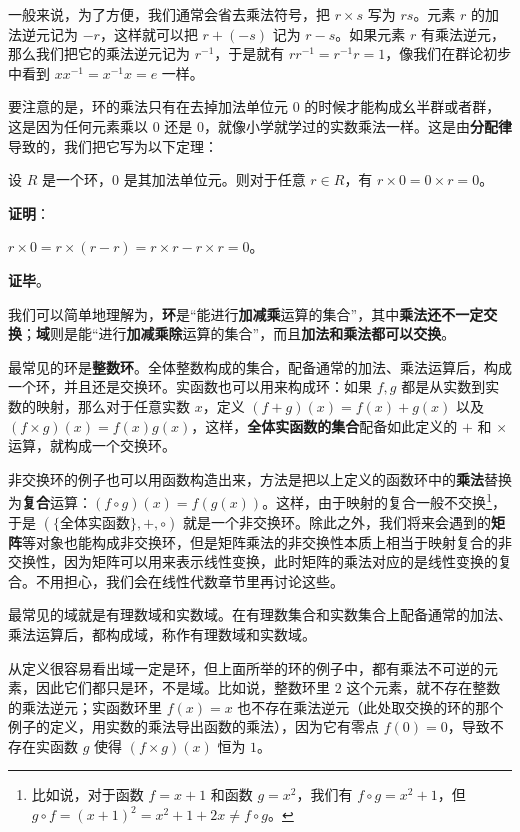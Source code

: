 一般来说，为了方便，我们通常会省去乘法符号，把 $r\times s$ 写为 $rs$。元素 $r$ 的加法逆元记为 $-r$，这样就可以把 $r+(-s)$ 记为 $r-s$。如果元素 $r$ 有乘法逆元，那么我们把它的乘法逆元记为 $r^{-1}$，于是就有 $rr^{-1}=r^{-1}r=1$，像我们在群论初步中看到 $xx^{-1}=x^{-1}x=e$ 一样。

要注意的是，环的乘法只有在去掉加法单位元 $0$ 的时候才能构成幺半群或者群，这是因为任何元素乘以 $0$ 还是 $0$，就像小学就学过的实数乘法一样。这是由\textbf{分配律}导致的，我们把它写为以下定理：

\begin{theorem}{}
设 $R$ 是一个环，$0$ 是其加法单位元。则对于任意 $r\in R$，有 $r\times 0=0\times r=0$。
\end{theorem}
\textbf{证明}：

$r\times 0=r\times (r-r)=r\times r-r\times r=0$。

\textbf{证毕}。



我们可以简单地理解为，\textbf{环}是“能进行\textbf{加减乘}运算的集合”，其中\textbf{乘法还不一定交换}；\textbf{域}则是能“进行\textbf{加减乘除}运算的集合”，而且\textbf{加法和乘法都可以交换}。

最常见的环是\textbf{整数环}。全体整数构成的集合，配备通常的加法、乘法运算后，构成一个环，并且还是交换环。实函数也可以用来构成环：如果 $f, g$ 都是从实数到实数的映射，那么对于任意实数 $x$，定义 $(f+g)(x)=f(x)+g(x)$ 以及 $(f\times g)(x)=f(x)g(x)$，这样，\textbf{全体实函数的集合}配备如此定义的 $+$ 和 $\times$ 运算，就构成一个交换环。

非交换环的例子也可以用函数构造出来，方法是把以上定义的函数环中的\textbf{乘法}替换为\textbf{复合}运算：$(f\circ g)(x)=f(g(x))$。这样，由于映射的复合一般不交换\footnote{比如说，对于函数 $f=x+1$ 和函数 $g=x^2$，我们有 $f\circ g=x^2+1$，但 $g\circ f=(x+1)^2=x^2+1+2x\not=f\circ g$。}，于是 $(\{\text{全体实函数}\}, +, \circ)$ 就是一个非交换环。除此之外，我们将来会遇到的\textbf{矩阵}等对象也能构成非交换环，但是矩阵乘法的非交换性本质上相当于映射复合的非交换性，因为矩阵可以用来表示线性变换，此时矩阵的乘法对应的是线性变换的复合。不用担心，我们会在线性代数章节里再讨论这些。

最常见的域就是有理数域和实数域。在有理数集合和实数集合上配备通常的加法、乘法运算后，都构成域，称作有理数域和实数域。

从定义很容易看出域一定是环，但上面所举的环的例子中，都有乘法不可逆的元素，因此它们都只是环，不是域。比如说，整数环里 $2$ 这个元素，就不存在整数的乘法逆元；实函数环里 $f(x)=x$ 也不存在乘法逆元（此处取交换的环的那个例子的定义，用实数的乘法导出函数的乘法），因为它有零点 $f(0)=0$，导致不存在实函数 $g$ 使得 $(f\times g)(x)$ 恒为 $1$。




